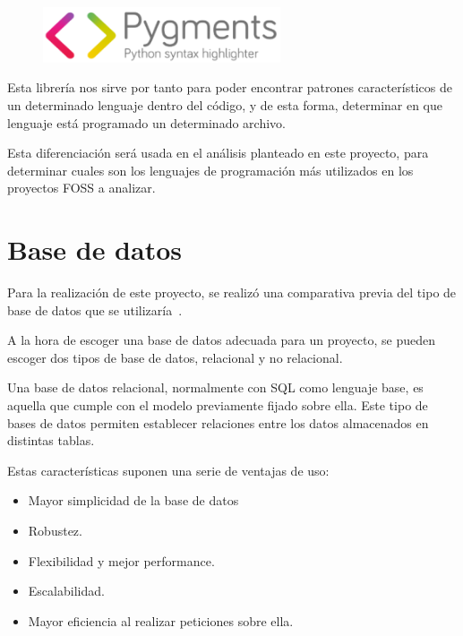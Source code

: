 \documentclass[a4paper, spanish, 12pt]{book}
\begin{document}
\begin{figure}[H]
  \centering
  \includegraphics[width=7cm, keepaspectratio]{img/pygments-logo}
\end{figure}

Esta librer\'ia nos sirve por tanto para poder encontrar patrones caracter\'isticos
de un determinado lenguaje dentro del c\'odigo, y de esta forma, determinar en que
lenguaje est\'a programado un determinado archivo.

Esta diferenciaci\'on ser\'a usada en el an\'alisis planteado en este proyecto,
para determinar cuales son los lenguajes de programaci\'on m\'as utilizados
en los proyectos FOSS a analizar.

\section{Base de datos}
\label{sec:database}

Para la realizaci\'on de este proyecto, se realiz\'o una comparativa previa del
tipo de base de datos que se utilizar\'ia~\cite{sqlvsnosql}.

A la hora de escoger una base de datos adecuada para un proyecto, se pueden
escoger dos tipos de base de datos, relacional y no relacional.

Una base de datos relacional, normalmente con SQL como lenguaje base, es aquella
que cumple con el modelo previamente fijado sobre ella. Este tipo de bases de datos
permiten establecer relaciones entre los datos almacenados en distintas tablas.

Estas caracter\'isticas suponen una serie de ventajas de uso:

\begin{itemize}

\item Mayor simplicidad de la base de datos

\item Robustez.

\item Flexibilidad y mejor performance.

\item Escalabilidad.

\item Mayor eficiencia al realizar peticiones sobre ella.

\end{itemize}
\end{document}
